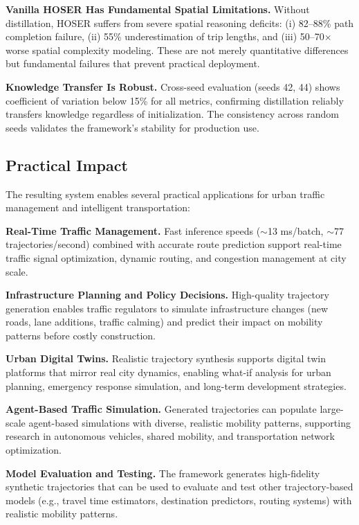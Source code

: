 \textbf{Vanilla HOSER Has Fundamental Spatial Limitations.} Without distillation, HOSER suffers from severe spatial reasoning deficits: (i) 82--88\% path completion failure, (ii) 55\% underestimation of trip lengths, and (iii) 50--70$\times$ worse spatial complexity modeling. These are not merely quantitative differences but fundamental failures that prevent practical deployment.

\textbf{Knowledge Transfer Is Robust.} Cross-seed evaluation (seeds 42, 44) shows coefficient of variation below 15\% for all metrics, confirming distillation reliably transfers knowledge regardless of initialization. The consistency across random seeds validates the framework's stability for production use.

\subsection{Practical Impact}
\label{sec:conclusion-impact}

The resulting system enables several practical applications for urban traffic management and intelligent transportation:

\textbf{Real-Time Traffic Management.} Fast inference speeds ($\sim$13 ms/batch, $\sim$77 trajectories/second) combined with accurate route prediction support real-time traffic signal optimization, dynamic routing, and congestion management at city scale.

\textbf{Infrastructure Planning and Policy Decisions.} High-quality trajectory generation enables traffic regulators to simulate infrastructure changes (new roads, lane additions, traffic calming) and predict their impact on mobility patterns before costly construction.

\textbf{Urban Digital Twins.} Realistic trajectory synthesis supports digital twin platforms that mirror real city dynamics, enabling what-if analysis for urban planning, emergency response simulation, and long-term development strategies.

\textbf{Agent-Based Traffic Simulation.} Generated trajectories can populate large-scale agent-based simulations with diverse, realistic mobility patterns, supporting research in autonomous vehicles, shared mobility, and transportation network optimization.

\textbf{Model Evaluation and Testing.} The framework generates high-fidelity synthetic trajectories that can be used to evaluate and test other trajectory-based models (e.g., travel time estimators, destination predictors, routing systems) with realistic mobility patterns.

